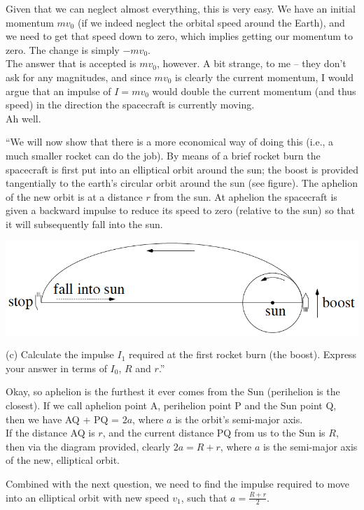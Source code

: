 \documentclass[8.01x]{subfiles}
\begin{document}
Given that we can neglect almost everything, this is very easy. We have an initial momentum $m v_0$ (if we indeed neglect the orbital speed around the Earth), and we need to get that speed down to zero, which implies getting our momentum to zero. The change is simply $-m v_0$.\\
The answer that is accepted is $m v_0$, however. A bit strange, to me -- they don't ask for any magnitudes, and since $m v_0$ is clearly the current momentum, I would argue that an impulse of $I = m v_0$ would double the current momentum (and thus speed) in the direction the spacecraft is currently moving.\\
Ah well.

``We will now show that there is a more economical way of doing this (i.e., a much smaller rocket can do the job). By means of a brief rocket burn the spacecraft is first put into an elliptical orbit around the sun; the boost is provided tangentially to the earth's circular orbit around the sun (see figure). The aphelion of the new orbit is at a distance $r$ from the sun. At aphelion the spacecraft is given a backward impulse to reduce its speed to zero (relative to the sun) so that it will subsequently fall into the sun.

\begin{center}
\includegraphics[scale=0.6]{Graphics/h8p1}
\end{center}

(c) Calculate the impulse $I_1$ required at the first rocket burn (the boost). Express your answer in terms of $I_0$, $R$ and $r$.''

Okay, so aphelion is the furthest it ever comes from the Sun (perihelion is the closest). If we call aphelion point A, perihelion point P and the Sun point Q, then we have AQ + PQ = $2a$, where $a$ is the orbit's semi-major axis.\\
If the distance AQ is $r$, and the current distance PQ from us to the Sun is $R$, then via the diagram provided, clearly $2a = R + r$, where $a$ is the semi-major axis of the new, elliptical orbit.

Combined with the next question, we need to find the impulse required to move into an elliptical orbit with new speed $v_1$, such that $\displaystyle a = \frac{R + r}{2}$.
\end{document}
